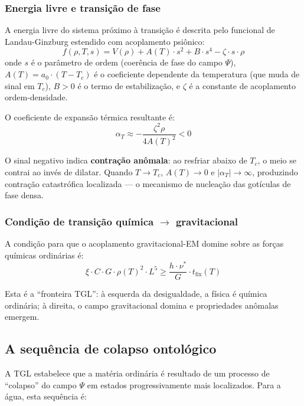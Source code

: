 \documentclass[12pt,a4paper]{article}
\newcommand{\tfix}{t_{\text{fix}}}
\newcommand{\Tcrit}{T_c}
\begin{document}
\subsubsection{Energia livre e transição de fase}

A energia livre do sistema próximo à transição é descrita pelo
funcional de Landau-Ginzburg estendido com acoplamento psiônico:
\begin{equation}
f(\rho, T, s) = V(\rho) + A(T) \cdot s^2 + B \cdot s^4
  - \zeta \cdot s \cdot \rho
\label{eq:energia_livre}
\end{equation}
onde $s$ é o parâmetro de ordem (coerência de fase do campo
$\Psi$), $A(T) = a_0 \cdot (T - \Tcrit)$ é o coeficiente
dependente da temperatura (que muda de sinal em $\Tcrit$),
$B > 0$ é o termo de estabilização, e $\zeta$ é a constante
de acoplamento ordem-densidade.

O coeficiente de expansão térmica resultante é:
\begin{equation}
\alpha_T \approx -\frac{\zeta^2 \rho}{4A(T)^2} < 0
\label{eq:alpha_t}
\end{equation}

O sinal negativo indica \textbf{contração anômala}: ao
resfriar abaixo de $\Tcrit$, o meio se contrai ao invés de
dilatar. Quando $T \to \Tcrit$, $A(T) \to 0$ e
$|\alpha_T| \to \infty$, produzindo contração catastrófica
localizada --- o mecanismo de nucleação das gotículas de
fase densa.

\subsubsection{Condição de transição química $\to$ gravitacional}

A condição para que o acoplamento gravitacional-EM domine
sobre as forças químicas ordinárias é:
\begin{equation}
\xi \cdot C \cdot G \cdot \rho(T)^2 \cdot L^5 \geq
  \frac{h \cdot \nu^*}{G} \cdot \tfix(T)
\label{eq:transicao}
\end{equation}

Esta é a ``fronteira TGL'': à esquerda da desigualdade, a
física é química ordinária; à direita, o campo gravitacional
domina e propriedades anômalas emergem.

\subsection{A sequência de colapso ontológico}

A TGL estabelece que a matéria ordinária é resultado de um
processo de ``colapso'' do campo $\Psi$ em estados
progressivamente mais localizados. Para a água, esta sequência
é:
\end{document}
